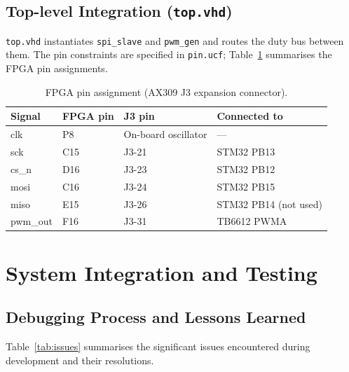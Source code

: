 \documentclass[12pt, a4paper]{report}
\begin{document}
\section{Top-level Integration (\texttt{top.vhd})}

\texttt{top.vhd} instantiates \texttt{spi\_slave} and \texttt{pwm\_gen} and
routes the duty bus between them. The pin constraints are specified in
\texttt{pin.ucf}; Table~\ref{tab:fpga_pins} summarises the FPGA pin
assignments.

\begin{table}[H]
    \centering
    \caption{FPGA pin assignment (AX309 J3 expansion connector).}
    \label{tab:fpga_pins}
    \begin{tabular}{llll}
        \toprule
        \textbf{Signal} & \textbf{FPGA pin} & \textbf{J3 pin} & \textbf{Connected to} \\
        \midrule
        clk     & P8  & On-board oscillator & --- \\
        sck     & C15 & J3-21 & STM32 PB13 \\
        cs\_n   & D16 & J3-23 & STM32 PB12 \\
        mosi    & C16 & J3-24 & STM32 PB15 \\
        miso    & E15 & J3-26 & STM32 PB14 (not used) \\
        pwm\_out & F16 & J3-31 & TB6612 PWMA \\
        \bottomrule
    \end{tabular}
\end{table}

\chapter{System Integration and Testing}

\section{Debugging Process and Lessons Learned}

Table~\ref{tab:issues} summarises the significant issues encountered during
development and their resolutions.
\end{document}
